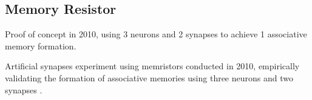 \subsection{Memory Resistor}
\label{sec:current_capabilities_memory_resistor}


Proof of concept in 2010, using 3 neurons and 2 synapses to achieve 1 associative memory formation.

Artificial synapses experiment using memristors conducted in 2010, empirically validating the formation of associative memories using three neurons and two synapses \cite{memristor_conditioning}.

%
